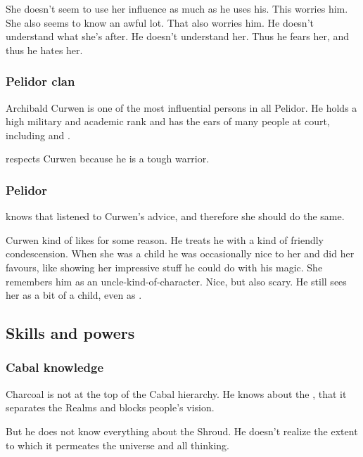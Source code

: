 She doesn't seem to use her influence as much as he uses his. 
This worries him. 
She also seems to know an awful lot. 
That also worries him. 
He doesn't understand what she's after. 
He doesn't understand her. 
Thus he fears her, and thus he hates her. 





\subsubsection{Pelidor clan}
Archibald Curwen is one of the most influential persons in all Pelidor. 
He holds a high military and academic rank and has the ears of many people at court, including \Icor{} and \Sethgal. 

\Sethgal{} respects Curwen because he is a tough warrior. 





\subsubsection{\Tiroco Pelidor}
\Tiroco{} knows that \Icor{} listened to Curwen's advice, and therefore she should do the same. 

Curwen kind of likes \Tiroco for some reason. 
He treats he with a kind of friendly condescension.
When she was a child he was occasionally nice to her and did her favours, like showing her impressive stuff he could do with his magic. 
She remembers him as an uncle-kind-of-character.
Nice, but also scary.
He still sees her as a bit of a child, even as \rinyuth.









\subsection{Skills and powers}





\subsubsection{Cabal knowledge}
Charcoal is not at the top of the Cabal hierarchy. He knows about the , that it separates the Realms and blocks people's vision. 

But he does not know everything about the Shroud. He doesn't realize the extent to which it permeates the universe and all thinking. 





